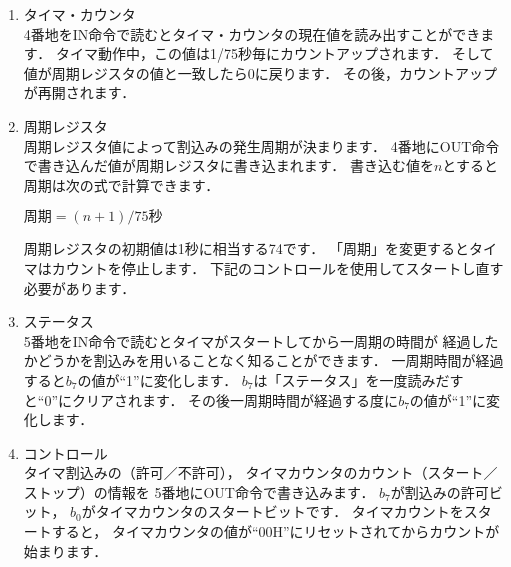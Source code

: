 \begin{enumerate}
\item タイマ・カウンタ \\
4番地をIN命令で読むとタイマ・カウンタの現在値を読み出すことができます．
タイマ動作中，この値は1/75秒毎にカウントアップされます．
そして値が周期レジスタの値と一致したら0に戻ります．
その後，カウントアップが再開されます．

\begin{center}
\end{center}

\item 周期レジスタ \\
周期レジスタ値によって割込みの発生周期が決まります．
4番地にOUT命令で書き込んだ値が周期レジスタに書き込まれます．
書き込む値を$n$とすると周期は次の式で計算できます．

$周期=(n+1)/75 秒$

周期レジスタの初期値は1秒に相当する74です．
「周期」を変更するとタイマはカウントを停止します．
下記のコントロールを使用してスタートし直す必要があります．

\begin{center}
\end{center}

\item ステータス \\
5番地をIN命令で読むとタイマがスタートしてから一周期の時間が
経過したかどうかを割込みを用いることなく知ることができます．
一周期時間が経過すると$b_7$の値が``1''に変化します．
$b_7$は「ステータス」を一度読みだすと``0''にクリアされます．
その後一周期時間が経過する度に$b_7$の値が``1''に変化します．

\begin{center}
\end{center}

\item コントロール \\
タイマ割込みの（許可／不許可），
タイマカウンタのカウント（スタート／ストップ）の情報を
5番地にOUT命令で書き込みます．
$b_7$が割込みの許可ビット，
$b_0$がタイマカウンタのスタートビットです．
タイマカウントをスタートすると，
タイマカウンタの値が``00H''にリセットされてからカウントが始まります．

\begin{center}
\end{center}

\end{enumerate}


